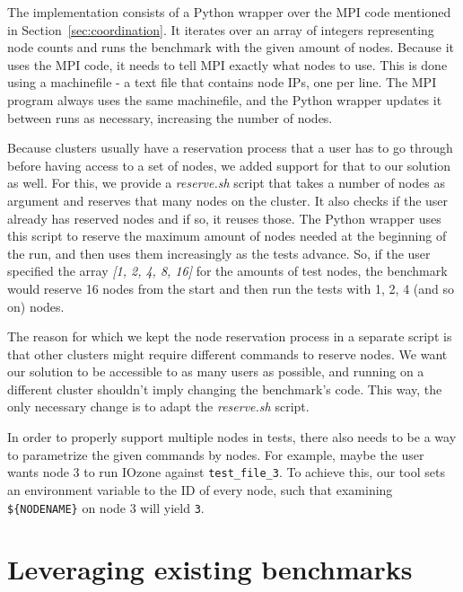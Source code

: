 The implementation consists of a Python wrapper over the MPI code mentioned in Section~\ref{sec:coordination}. It iterates over an array of integers representing node counts and runs the benchmark with the given amount of nodes. Because it uses the MPI code, it needs to tell MPI exactly what nodes to use. This is done using a machinefile - a text file that contains node IPs, one per line. The MPI program always uses the same machinefile, and the Python wrapper updates it between runs as necessary, increasing the number of nodes.

Because clusters usually have a reservation process that a user has to go through before having access to a set of nodes, we added support for that to our solution as well. For this, we provide a \textit{reserve.sh} script that takes a number of nodes as argument and reserves that many nodes on the cluster. It also checks if the user already has reserved nodes and if so, it reuses those. The Python wrapper uses this script to reserve the maximum amount of nodes needed at the beginning of the run, and then uses them increasingly as the tests advance. So, if the user specified the array \textit{[1, 2, 4, 8, 16]} for the amounts of test nodes, the benchmark would reserve 16 nodes from the start and then run the tests with 1, 2, 4 (and so on) nodes.

The reason for which we kept the node reservation process in a separate script is that other clusters might require different commands to reserve nodes. We want our solution to be accessible to as many users as possible, and running on a different cluster shouldn't imply changing the benchmark's code. This way, the only necessary change is to adapt the \textit{reserve.sh} script.

In order to properly support multiple nodes in tests, there also needs to be a way to parametrize the given commands by nodes. For example, maybe the user wants node 3 to run IOzone against \texttt{test\_file\_3}. To achieve this, our tool sets an environment variable to the ID of every node, such that examining \texttt{\$\{NODENAME\}} on node 3 will yield \texttt{3}.


\section{Leveraging existing benchmarks}

